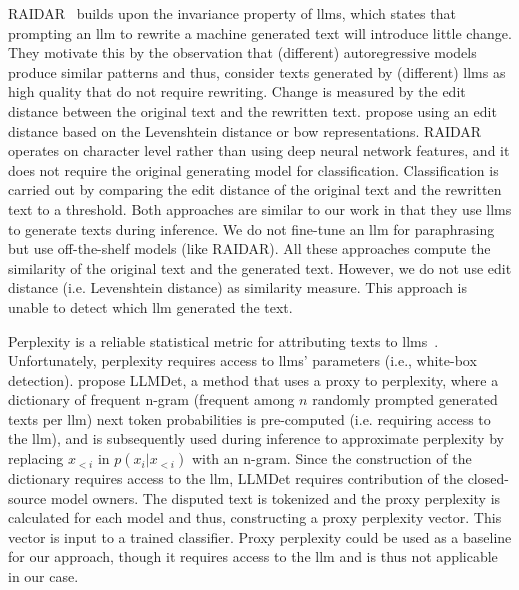 RAIDAR~\citep{mao_raidar_2024} builds upon the invariance property of \acp{llm}, 
which states that prompting an \ac{llm} to rewrite a machine generated text will introduce little change.
They motivate this by the observation that (different) autoregressive models produce similar patterns and thus, 
consider texts generated by (different) \acp{llm} as high quality that do not require rewriting.
Change is measured by the edit distance between the original text and the rewritten text. 
\citet{mao_raidar_2024} propose using an edit distance based on the Levenshtein distance or \ac{bow} representations.
RAIDAR operates on character level rather than using deep neural network features, and it does not require the original generating model for classification. 
Classification is carried out by comparing the edit distance of the original text and the rewritten text to a threshold.
Both approaches are similar to our work in that they use \acp{llm} to generate texts during inference.
We do not fine-tune an \ac{llm} for paraphrasing but use off-the-shelf models (like RAIDAR).
All these approaches compute the similarity of the original text and the generated text.
However, we do not use edit distance (i.e. Levenshtein distance) as similarity measure.
This approach is unable to detect which \ac{llm} generated the text.

Perplexity is a reliable statistical metric for attributing texts to \acp{llm}~\citep{zhang_llmdet_2023}.
Unfortunately, perplexity requires access to \acp{llm}' parameters (i.e., white-box detection).
\citet{wu_llmdet_2023} propose LLMDet, a method that uses a proxy to perplexity, 
where a dictionary of frequent n-gram (frequent among $n$ randomly prompted generated texts per \ac{llm}) 
next token probabilities is pre-computed (i.e. requiring access to the \ac{llm}), 
and is subsequently used during inference to approximate perplexity by replacing $x_{<i}$ in $p(x_i | x_{<i})$ with an n-gram.
Since the construction of the dictionary requires access to the \ac{llm}, LLMDet requires contribution of the closed-source model owners.
The disputed text is tokenized and the proxy perplexity is calculated for each model and thus, constructing a proxy perplexity vector.
This vector is input to a trained classifier.
Proxy perplexity could be used as a baseline for our approach, though it requires access to the \ac{llm} and is thus not applicable in our case.

